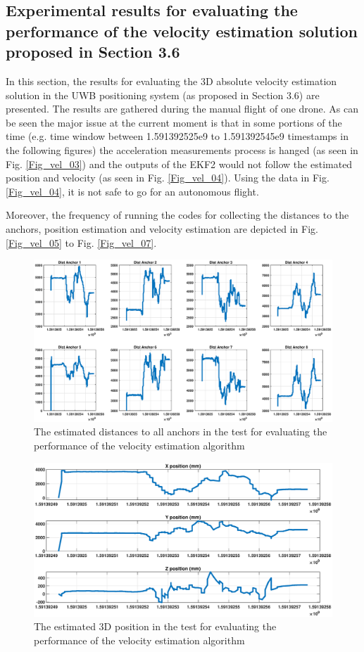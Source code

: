 \documentclass{article}
\begin{document}
\newpage
\subsection{Experimental results for evaluating the performance of the velocity estimation solution proposed in Section 3.6}
In this section, the results for evaluating the 3D absolute velocity estimation solution in the UWB positioning system (as proposed in Section 3.6) are presented.
The results are gathered during the manual flight of one drone.
As can be seen the major issue at the current moment is that in some portions of the time (e.g. time window between 1.591392525e9 to 1.591392545e9 timestamps in the following figures) the acceleration measurements process is hanged (as seen in Fig. \ref{Fig_vel_03}) and the outputs of the EKF2 would not follow the estimated position and velocity (as seen in Fig. \ref{Fig_vel_04}). Using the data in Fig. \ref{Fig_vel_04}, it is not safe to go for an autonomous flight.

Moreover, the frequency of running the codes for collecting the distances to the anchors, position estimation and velocity estimation are depicted in Fig. \ref{Fig_vel_05} to Fig. \ref{Fig_vel_07}. 

\begin{figure}[thpb]
\centering
\includegraphics[scale=0.35]{Pics/R05June_Dist.eps}
\caption{The estimated distances to all anchors in the test for evaluating the performance of the velocity estimation algorithm}
\label{Fig_vel_00}
\end{figure}

\begin{figure}[thpb]
\centering
\includegraphics[scale=0.35]{Pics/R05June_Pos.eps}
\caption{The estimated 3D position in the test for evaluating the performance of the velocity estimation algorithm}
\label{Fig_vel_01}
\end{figure}
\end{document}
